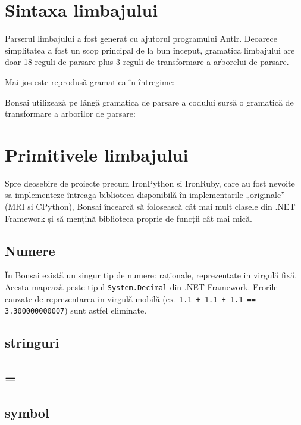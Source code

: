 \documentclass[12pt,a4paper]{memoir}
\begin{document}
\chapter{Sintaxa limbajului}

Parserul limbajului a fost generat cu ajutorul programului Antlr. Deoarece simplitatea a fost un scop principal de la bun început, gramatica limbajului are doar 18 reguli de parsare plus 3 reguli de transformare a arborelui de parsare. 

Mai jos este reprodusă gramatica în întregime:

Bonsai utilizează pe lângă gramatica de parsare a codului sursă o gramatică de transformare a arborilor de parsare:

\chapter{Primitivele limbajului}

Spre deosebire de proiecte precum IronPython si IronRuby, care au fost nevoite sa implementeze întreaga biblioteca disponibilă în implementarile „originale” (MRI si CPython), Bonsai încearcă să folosească cât mai mult clasele din .NET Framework și să mențină biblioteca proprie de funcții cât mai mică.

\section{Numere}

În Bonsai există un singur tip de numere: raționale, reprezentate in virgulă fixă. Acesta mapează peste tipul \texttt{System.Decimal} din .NET Framework. Erorile cauzate de reprezentarea in virgulă mobilă (ex. \texttt{1.1 + 1.1 + 1.1 == 3.300000000007}) sunt astfel eliminate.

\section{stringuri}

\section{=}

\section{symbol}
\end{document}

